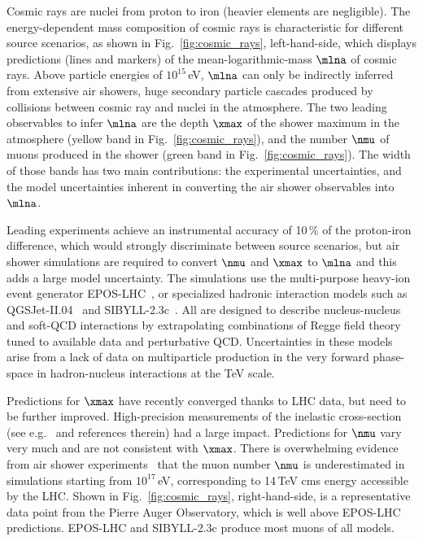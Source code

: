\documentclass[../report.tex]{subfiles}
\begin{document}
Cosmic rays are nuclei from proton to iron (heavier elements are negligible). The energy-dependent mass composition of cosmic rays is characteristic for different source scenarios, as shown in Fig.~\ref{fig:cosmic_rays}, left-hand-side, which displays predictions (lines and markers) of the mean-logarithmic-mass $\mlna$ of cosmic rays. Above particle energies of $10^{15}$\,\si{eV}, $\mlna$ can only be indirectly inferred from extensive air showers, huge secondary particle cascades produced by collisions between cosmic ray and nuclei in the atmosphere. The two leading observables to infer $\mlna$ are the depth $\xmax$ of the shower maximum in the atmosphere (yellow band in Fig.~\ref{fig:cosmic_rays}), and the number $\nmu$ of muons produced in the shower (green band in Fig.~\ref{fig:cosmic_rays}). The width of those bands has two main contributions: the experimental uncertainties, and the model uncertainties inherent in converting the air shower observables into $\mlna$.

Leading experiments achieve an instrumental accuracy of 10\,\% of the proton-iron difference, which would strongly discriminate between source scenarios, but air shower simulations are required to convert $\nmu$ and $\xmax$ to $\mlna$ and this adds a large model uncertainty. The simulations use the multi-purpose heavy-ion event generator EPOS-LHC~\cite{Werner:2005jf}, or specialized hadronic interaction models such as \mbox{QGSJet-II.04}~\cite{Ostapchenko:2010vb} and SIBYLL-2.3c~\cite{Riehn:2017mfm}. All are designed to describe nucleus-nucleus and soft-QCD interactions by extrapolating combinations of Regge field theory tuned to available data and perturbative QCD. Uncertainties in these models arise from a lack of data on multiparticle production in the very forward phase-space in hadron-nucleus interactions at the TeV scale.

Predictions for $\xmax$ have recently converged thanks to LHC data, but need to be further improved. High-precision measurements of the inelastic cross-section (see e.g.~\cite{Aaij:2018okq} and references therein) had a large impact. Predictions for $\nmu$ vary very much and are not consistent with $\xmax$. There is overwhelming evidence from air shower experiments~\cite{Dembinski:2018UHECR,Aab:2014pza,Dembinski:2017zkb,Kokoulin:2009zz,Abbasi:2018fkz} that the muon number $\nmu$ is underestimated in simulations starting from $10^{17}$\,eV, corresponding to 14\,TeV cms energy accessible by the LHC. Shown in Fig.~\ref{fig:cosmic_rays}, right-hand-side, is a representative data point from the Pierre Auger Observatory, which is well above EPOS-LHC predictions. EPOS-LHC and SIBYLL-2.3c produce most muons of all models.
\end{document}
